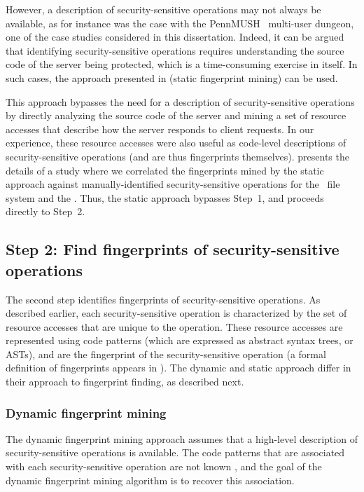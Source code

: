 However, a description of security-sensitive operations may not always be
available, as for instance was the case with the PennMUSH~\cite{games}
multi-user dungeon, one of the case studies considered in this dissertation.
Indeed, it can be argued that identifying security-sensitive operations
requires understanding the source code of the server being protected, which is
a time-consuming exercise in itself. In such cases, the approach presented
in  (static fingerprint mining) can be used.

This approach bypasses the need for a description of security-sensitive
operations by directly analyzing the source code of the server and mining a set
of resource accesses that describe how the server responds to client requests.
In our experience, these resource accesses were also useful as code-level
descriptions of security-sensitive operations (and are thus fingerprints
themselves).   presents the details of a study where we
correlated the fingerprints mined by the static approach against
manually-identified security-sensitive operations for the \ext~file system and
the \xserver. Thus, the static approach bypasses Step~1, and proceeds directly
to Step~2. 


\subsection{Step 2: Find fingerprints of security-sensitive operations} 
\label{chapter:overview:approach:step2}
%
The second step identifies fingerprints of security-sensitive operations. As
described earlier, each security-sensitive operation is characterized by the
set of resource accesses that are unique to the operation. These resource
accesses are represented using code patterns (which are expressed as abstract
syntax trees, or ASTs), and are the fingerprint of the security-sensitive
operation (a formal definition of fingerprints appears in
). The dynamic  and static approach differ in
their approach to fingerprint finding, as described next.


\subsubsection{Dynamic fingerprint mining}
\label{chapter:overview:approach:step2:dynamic}
%
The dynamic fingerprint mining approach assumes that a high-level description
of security-sensitive operations is available. The code patterns that are
associated with each security-sensitive operation are not known \apriori, and
the goal of the dynamic fingerprint mining algorithm is to recover this
association.

